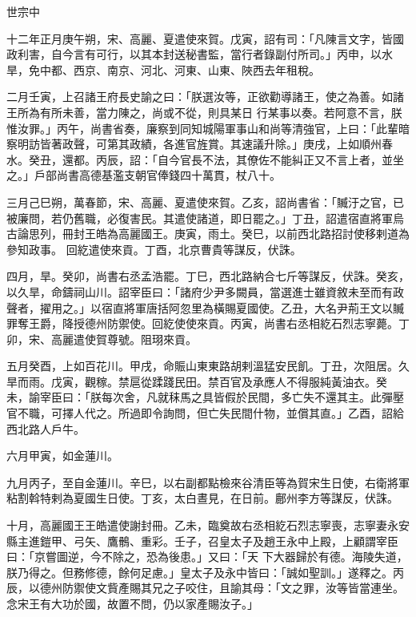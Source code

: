 
\begin{pinyinscope}

 世宗中



 十二年正月庚午朔，宋、高麗、夏遣使來賀。戊寅，詔有司：「凡陳言文字，皆國政利害，自今言有可行，以其本封送秘書監，當行者錄副付所司。」丙申，以水旱，免中都、西京、南京、河北、河東、山東、陜西去年租稅。



 二月壬寅，上召諸王府長史諭之曰：「朕選汝等，正欲勸導諸王，使之為善。如諸王所為有所未善，當力陳之，尚或不從，則具某日
 行某事以奏。若阿意不言，朕惟汝罪。」丙午，尚書省奏，廉察到同知城陽軍事山和尚等清強官，上曰：「此輩暗察明訪皆著政聲，可第其政績，各進官旌賞。其速議升除。」庚戌，上如順州春水。癸丑，還都。丙辰，詔：「自今官長不法，其僚佐不能糾正又不言上者，並坐之。」戶部尚書高德基濫支朝官俸錢四十萬貫，杖八十。



 三月己巳朔，萬春節，宋、高麗、夏遣使來賀。乙亥，詔尚書省：「贓汙之官，已被廉問，若仍舊職，必復害民。其遣使諸道，即日罷之。」丁丑，詔遣宿直將軍烏古論思列，冊封王皓為高麗國王。庚寅，雨土。癸巳，以前西北路招討使移剌道為參知政事。
 回紇遣使來貢。丁酉，北京曹貴等謀反，伏誅。



 四月，旱。癸卯，尚書右丞孟浩罷。丁巳，西北路納合七斤等謀反，伏誅。癸亥，以久旱，命鑄祠山川。詔宰臣曰：「諸府少尹多闕員，當選進士雖資敘未至而有政聲者，擢用之。」以宿直將軍唐括阿忽里為橫賜夏國使。乙丑，大名尹荊王文以贓罪奪王爵，降授德州防禦使。回紇使使來貢。丙寅，尚書右丞相紇石烈志寧薨。丁卯，宋、高麗遣使賀尊號。阻珝來貢。



 五月癸酉，上如百花川。甲戌，命賑山東東路胡剌溫猛安民飢。丁丑，次阻居。久旱而雨。戊寅，觀稼。禁扈從蹂踐民田。禁百官及承應人不得服純黃油衣。癸
 未，諭宰臣曰：「朕每次舍，凡就秣馬之具皆假於民間，多亡失不還其主。此彈壓官不職，可擇人代之。所過即令詢問，但亡失民間什物，並償其直。」乙酉，詔給西北路人戶牛。



 六月甲寅，如金蓮川。



 九月丙子，至自金蓮川。辛巳，以右副都點檢來谷清臣等為賀宋生日使，右衛將軍粘割斡特剌為夏國生日使。丁亥，太白晝見，在日前。鄜州李方等謀反，伏誅。



 十月，高麗國王王皓遣使謝封冊。乙未，臨奠故右丞相紇石烈志寧喪，志寧妻永安縣主進鎧甲、弓矢、鷹鶻、重彩。壬子，召皇太子及趙王永中上殿，上顧謂宰臣曰：「京嘗圖逆，今不除之，恐為後患。」又曰：「天
 下大器歸於有德。海陵失道，朕乃得之。但務修德，餘何足慮。」皇太子及永中皆曰：「誠如聖訓。」遂釋之。丙辰，以德州防禦使文貲產賜其兄之子咬住，且諭其母：「文之罪，汝等皆當連坐。念宋王有大功於國，故置不問，仍以家產賜汝子。」




\end{pinyinscope}
